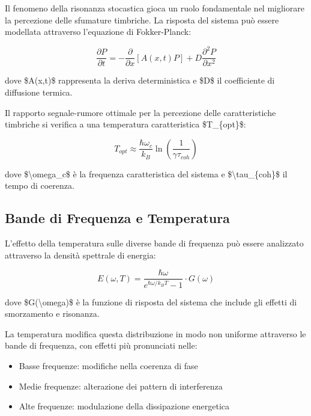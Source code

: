 \documentclass[a4paper,11pt]{article}
\begin{document}
Il fenomeno della risonanza stocastica gioca un ruolo fondamentale nel
migliorare la percezione delle sfumature timbriche. La risposta del
sistema può essere modellata attraverso l'equazione di Fokker-Planck:

\begin{displaymath}
\frac{\partial P}{\partial t} = -\frac{\partial}{\partial x}[A(x,t)P] + D\frac{\partial^2 P}{\partial x^2}
\end{displaymath}

dove \$A(x,t)\$ rappresenta la deriva deterministica e \$D\$ il coefficiente
di diffusione termica.

Il rapporto segnale-rumore ottimale per la percezione delle
caratteristiche timbriche si verifica a una temperatura caratteristica
\$T\_\{opt\}\$:

\begin{displaymath}
T_{opt} \approx \frac{\hbar\omega_c}{k_B}\ln\left(\frac{1}{\gamma\tau_{coh}}\right)
\end{displaymath}

dove \$\textbackslash{}omega\_c\$ è la frequenza caratteristica del sistema e \$\textbackslash{}tau\_\{coh\}\$
il tempo di coerenza.

\subsection{Bande di Frequenza e Temperatura}\hypertarget{bande-di-frequenza-e-temperatura}{}\label{bande-di-frequenza-e-temperatura}

L'effetto della temperatura sulle diverse bande di frequenza può essere
analizzato attraverso la densità spettrale di energia:

\begin{displaymath}
E(\omega, T) = \frac{\hbar\omega}{e^{\hbar\omega/k_BT} - 1} \cdot G(\omega)
\end{displaymath}

dove \$G(\textbackslash{}omega)\$ è la funzione di risposta del sistema che include gli
effetti di smorzamento e risonanza.

La temperatura modifica questa distribuzione in modo non uniforme
attraverso le bande di frequenza, con effetti più pronunciati nelle:

\begin{itemize}
\item{} Basse frequenze: modifiche nella coerenza di fase
\item{} Medie frequenze: alterazione dei pattern di interferenza
\item{} Alte frequenze: modulazione della dissipazione energetica
\end{itemize}
\end{document}
